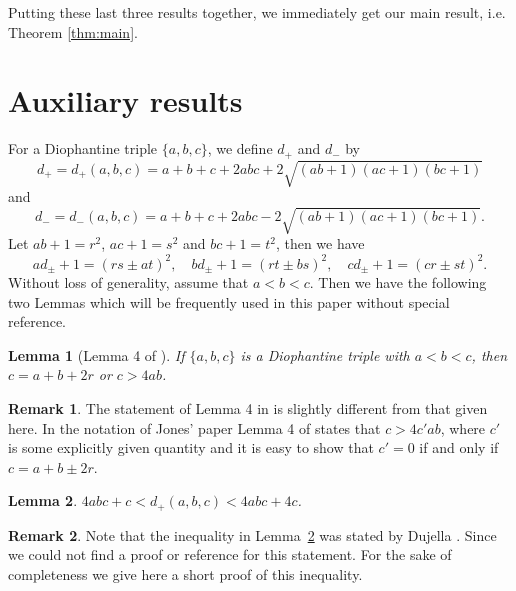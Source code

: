 \documentclass{amsart}
\newtheorem{lemma}{Lemma}
\theoremstyle{definition}
\newtheorem{remark}{Remark}[section]
\begin{document}
Putting these last three results together, we immediately get our main result, i.e. Theorem \ref{thm:main}.

\section{Auxiliary results}\label{sec:aux}

For a Diophantine triple $\{a, b, c\}$, we define $d_{+}$ and $d_{-}$ by 
$$
d_{+}=d_{+}(a, b, c) = a+b+c + 2abc + 2\sqrt{(ab+1)(ac+1)(bc+1)} 
$$ 
and 
$$
d_{-}=d_{-}(a,b,c) = a+b+c + 2abc -  2\sqrt{(ab+1)(ac+1)(bc+1)}. 
$$
Let $ab+1=r^2$, $ac+1=s^2$ and $bc+1=t^2$, then we have 
$$
{ad_{\pm}+1} =(rs\pm at)^2,\quad {bd_{\pm}+1} = (rt\pm bs)^2,\quad {cd_{\pm}+1} = (cr\pm st)^2. 
$$
Without loss of generality, assume that $a<b<c$. Then we have the following two Lemmas which will be frequently used in this paper
without special reference.

\begin{lemma}[Lemma 4 of  \cite{Jones:1978}]\label{lem:Jones}
 If $\{a,b,c\}$ is a Diophantine triple with $a<b<c$, then $c=a+b+2r$ or $c> 4ab$.
\end{lemma}

\begin{remark}
 The statement of Lemma 4 in \cite{Jones:1978} is slightly different from that given here. In the notation of Jones' paper
 Lemma 4 of \cite{Jones:1978} states that $c> 4c'ab$, where $c'$ is some explicitly given quantity and it is easy to show
 that $c'=0$ if and only if $c=a+b\pm 2r$.
\end{remark}

\begin{lemma}\label{lem:d+ieq}
$4abc+c<d_+(a,b,c)<4abc+4c$.
\end{lemma}

\begin{remark}
 Note that the inequality in Lemma~\ref{lem:d+ieq} was stated by Dujella \cite[page 189]{Dujella:2004}. Since we could not find a proof or reference for this statement.
For the sake of completeness we give here a short proof of this inequality.
\end{remark}
\end{document}
